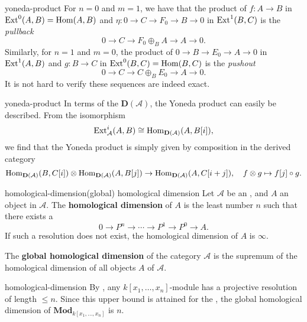 \begin{example}{yoneda-product}
    For $n = 0$ and $m = 1$, we have that the product of $f \colon A \to B$ in $\textup{Ext}^0(A, B) = \operatorname{Hom}(A, B)$ and $\eta \colon 0 \to C \to F_0 \to B \to 0$ in $\textup{Ext}^1(B, C)$ is the \textit{pullback}
    \[ 0 \to C \to F_0 \oplus_B A \to A \to 0 . \]
    Similarly, for $n = 1$ and $m = 0$, the product of $0 \to B \to E_0 \to A \to 0$ in $\textup{Ext}^1(A, B)$ and $g \colon B \to C$ in $\textup{Ext}^0(B, C) = \operatorname{Hom}(B, C)$ is the \textit{pushout}
    \[ 0 \to C \to C \oplus_B E_0 \to A \to 0 . \]
    It is not hard to verify these sequences are indeed exact. 
\end{example}

\begin{example}{yoneda-product}
    In terms of the  $\textbf{D}(\mathcal{A})$, the Yoneda product can easily be described. From the isomorphism
    \[ \textup{Ext}^i_\mathcal{A}(A, B) \cong \operatorname{Hom}_{\textbf{D}(\mathcal{A})}(A, B[i]), \]
    we find that the Yoneda product is simply given by composition in the derived category
    \[ \operatorname{Hom}_{\textbf{D}(\mathcal{A})}(B, C[i]) \otimes \operatorname{Hom}_{\textbf{D}(\mathcal{A})}(A, B[j]) \to \operatorname{Hom}_{\textbf{D}(\mathcal{A})}(A, C[i + j]), \quad f \otimes g \mapsto f[j] \circ g . \]
\end{example}

\begin{topic}{homological-dimension}{(global) homological dimension}
    Let $\mathcal{A}$ be an , and $A$ an object in $\mathcal{A}$. The \textbf{homological dimension} of $A$ is the least number $n$ such that there exists a 
    \[ 0 \to P^n \to \cdots \to P^1 \to P^0 \to A . \]
    If such a resolution does not exist, the homological dimension of $A$ is $\infty$.
    
    The \textbf{global homological dimension} of the category $\mathcal{A}$ is the supremum of the homological dimension of all objects $A$ of $\mathcal{A}$.
\end{topic}

\begin{example}{homological-dimension}
    By , any $k[x_1, \ldots, x_n]$-module has a projective resolution of length $\le n$. Since this upper bound is attained for the , the global homological dimension of $\textbf{Mod}_{k[x_1, \ldots, x_n]}$ is $n$.
\end{example}

